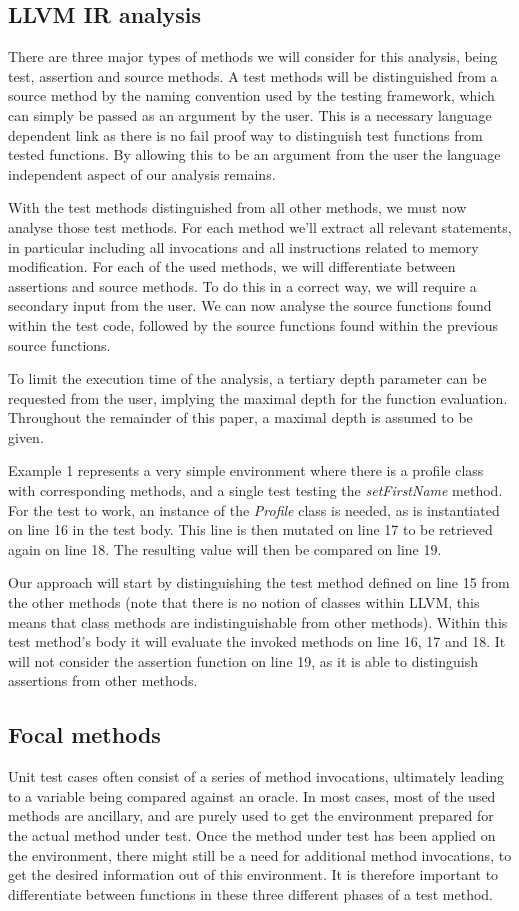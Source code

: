 \documentclass[11pt]{article}
\begin{document}
\begin{multicols}{2}
\subsection{LLVM IR analysis}
There are three major types of methods we will consider for this analysis, being test, assertion and source methods. A test methods will be distinguished from a source method by the naming convention used by the testing framework, which can simply be passed as an argument by the user. This is a necessary language dependent link as there is no fail proof way to distinguish test functions from tested functions. By allowing this to be an argument from the user the language independent aspect of our analysis remains.

With the test methods distinguished from all other methods, we must now analyse those test methods. For each method we'll extract all relevant statements, in particular including all invocations and all instructions related to memory modification. For each of the used methods, we will differentiate between assertions and source methods. To do this in a correct way, we will require a secondary input from the user. We can now analyse the source functions found within the test code, followed by the source functions found within the previous source functions.

To limit the execution time of the analysis, a tertiary depth parameter can be requested from the user, implying the maximal depth for the function evaluation. Throughout the remainder of this paper, a maximal depth is assumed to be given.

Example 1 represents a very simple environment where there is a profile class with corresponding methods, and a single test testing the \textit{setFirstName} method. For the test to work, an instance of the \textit{Profile} class is needed, as is instantiated on line 16 in the test body. This line is then mutated on line 17 to be retrieved again on line 18. The resulting value will then be compared on line 19. 

Our approach will start by distinguishing the test method defined on line 15 from the other methods (note that there is no notion of classes within LLVM, this means that class methods are indistinguishable from other methods). Within this test method's body it will evaluate the invoked methods on line 16, 17 and 18. It will not consider the assertion function on line 19, as it is able to distinguish assertions from other methods.

\subsection{Focal methods}
Unit test cases often consist of a series of method invocations, ultimately leading to a variable being compared against an oracle. In most cases, most of the used methods are ancillary, and are purely used to get the environment prepared for the actual method under test. Once the method under test has been applied on the environment, there might still be a need for additional method invocations, to get the desired information out of this environment. It is therefore important to differentiate between functions in these three different phases of a test method.


\end{multicols}
\end{document}
